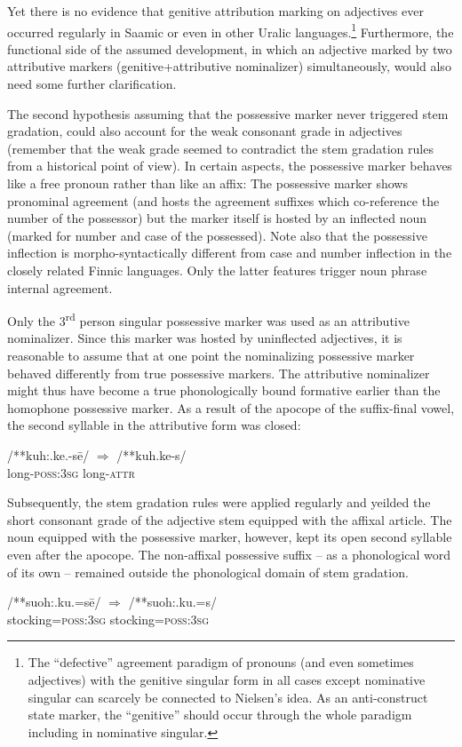 {Yet there is no evidence that genitive attribution marking on adjectives ever occurred regularly in Saamic or even in other Uralic languages.\footnote{The “defective” agreement paradigm of pronouns (and even sometimes adjectives) with the genitive singular form in all cases except nominative singular can scarcely be connected to Nielsen's idea. As an anti-construct state marker, the “genitive” should occur through the whole paradigm including in nominative singular.} Furthermore, the functional side of the assumed development, in which an adjective marked by two attributive markers (genitive+attributive nominalizer) simultaneously, would also need some further clarification.

The second hypothesis assuming that the possessive marker never triggered stem gradation, could also account for the weak consonant grade in adjectives (remember that the weak grade seemed to contradict the stem gradation rules from a historical point of view). In certain aspects, the possessive marker behaves like a free pronoun rather than like an affix: The possessive marker shows pronominal agreement (and hosts the agreement suffixes which co-reference the number of the possessor) but the marker itself is hosted by an inflected noun (marked for number and case of the possessed). Note also that the possessive inflection is morpho-syntactically different from case and number inflection in the closely related Finnic languages. Only the latter features trigger noun phrase internal agreement.

Only the 3\textsuperscript{rd} person singular possessive marker was used as an attributive nominalizer. Since this marker was hosted by uninflected adjectives, it is reasonable to assume that at one point the nominalizing possessive marker behaved differently from true possessive markers. The attributive nominalizer might thus have become a true phonologically bound formative earlier than the homophone possessive marker. As a result of the apocope of the suffix-final vowel, the second syllable in the attributive form was closed:
\begin{exe}
\ex 
\gll	/**kuh:.ke.-sē/ $\Rightarrow$ /**kuh.ke-s/\\
	long-\textsc{poss:3sg} {} long-\textsc{attr}\\
\end{exe}
Subsequently, the stem gradation rules were applied regularly and yeilded the short consonant grade of the adjective stem equipped with the affixal article. The noun equipped with the possessive marker, however, kept its open second syllable even after the apocope. The non-affixal possessive suffix – as a phonological word of its own – remained outside the phonological domain of stem gradation.
\begin{exe}
\ex 
\gll	/**suoh:.ku.=sē/ $\Rightarrow$ /**suoh:.ku.=s/\\
	stocking=\textsc{poss:3sg} {} stocking=\textsc{poss:3sg}\\
\end{exe}

}
